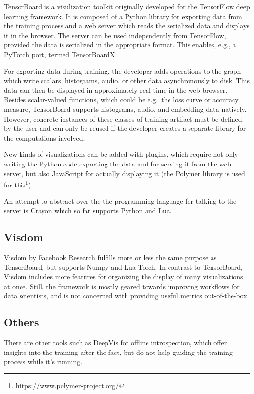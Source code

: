     TensorBoard is a visulization toolkit originally developed for the TensorFlow \citep{tensorflow2015-whitepaper} deep
    learning framework. It is composed of a Python library for exporting data from the training process and a web server
    which reads the serialized data and displays it in the browser. The server can be used independently from
    TensorFlow, provided the data is serialized in the appropriate format. This enables, e.g., a PyTorch port, termed
    TensorBoardX.

    For exporting data during training, the developer adds operations to the
    graph which write scalars, histograms, audio, or other data
    asynchronously to disk. This data can then be displayed in approximately
    real-time in the web browser. Besides scalar-valued functions, which
    could be e.g.~the loss curve or accuracy measure, TensorBoard supports
    histograms, audio, and embedding data natively. However, concrete
    instances of these classes of training artifact must be defined by the
    user and can only be reused if the developer creates a separate library
    for the computations involved.

    New kinds of visualizations can be added with plugins, which require not
    only writing the Python code exporting the data and for serving it from
    the web server, but also JavaScript for actually displaying it (the
    Polymer library is used for this\footnote{\url{https://www.polymer-project.org/}}).

    An attempt to abstract over the the programming language for talking to
    the server is \href{https://github.com/torrvision/crayon}{Crayon} which
    so far supports Python and Lua.

    \hypertarget{visdom}{%
    \subsection*{Visdom}\label{visdom}}

    Visdom by Facebook Research fulfills more or less the same purpose as
    TensorBoard, but supports Numpy and Lua Torch. In contrast to
    TensorBoard, Visdom includes more features for organizing the display of
    many visualizations at once. Still, the framework is mostly geared
    towards improving workflows for data scientists, and is not concerned
    with providing useful metrics out-of-the-box.

    \hypertarget{others}{%
    \subsection*{Others}\label{others}}

    There are other tools such as
    \href{http://yosinski.com/deepvis}{DeepVis} for offline introspection,
    which offer insights into the training after the fact, but do not help
    guiding the training process while it's running.
